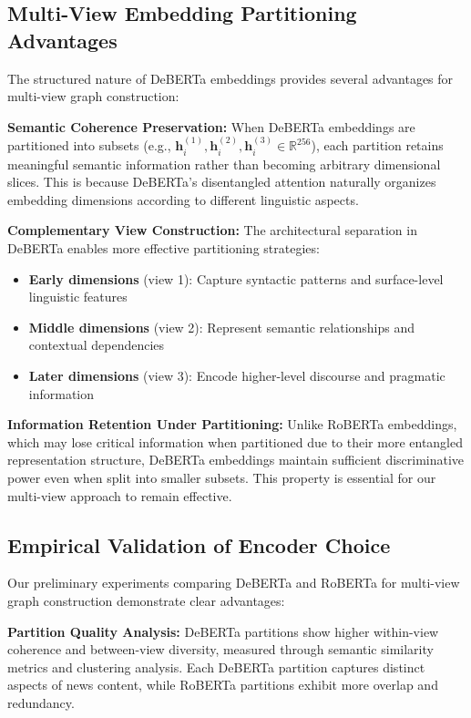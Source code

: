 \subsection{Multi-View Embedding Partitioning Advantages}

The structured nature of DeBERTa embeddings provides several advantages for multi-view graph construction:

\textbf{Semantic Coherence Preservation:} When DeBERTa embeddings are partitioned into subsets (e.g., $\mathbf{h}_i^{(1)}, \mathbf{h}_i^{(2)}, \mathbf{h}_i^{(3)} \in \mathbb{R}^{256}$), each partition retains meaningful semantic information rather than becoming arbitrary dimensional slices. This is because DeBERTa's disentangled attention naturally organizes embedding dimensions according to different linguistic aspects.

\textbf{Complementary View Construction:} The architectural separation in DeBERTa enables more effective partitioning strategies:
\begin{itemize}
    \item \textbf{Early dimensions} (view 1): Capture syntactic patterns and surface-level linguistic features
    \item \textbf{Middle dimensions} (view 2): Represent semantic relationships and contextual dependencies  
    \item \textbf{Later dimensions} (view 3): Encode higher-level discourse and pragmatic information
\end{itemize}

\textbf{Information Retention Under Partitioning:} Unlike RoBERTa embeddings, which may lose critical information when partitioned due to their more entangled representation structure, DeBERTa embeddings maintain sufficient discriminative power even when split into smaller subsets. This property is essential for our multi-view approach to remain effective.

\subsection{Empirical Validation of Encoder Choice}

Our preliminary experiments comparing DeBERTa and RoBERTa for multi-view graph construction demonstrate clear advantages:

\textbf{Partition Quality Analysis:} DeBERTa partitions show higher within-view coherence and between-view diversity, measured through semantic similarity metrics and clustering analysis. Each DeBERTa partition captures distinct aspects of news content, while RoBERTa partitions exhibit more overlap and redundancy.

